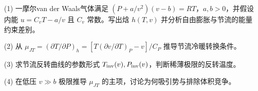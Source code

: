 (1) 一摩尔van der Waals气体满足 \((P+a/v^2)(v-b)=RT\)，\(a,b>0\)，并假设内能 \(u=C_vT-a/v\) 且 \(C_v\) 常数。写出焓 \(h(T,v)\) 并分析自由膨胀与节流的能量约束差别。

(2) 从 \(\mu_{JT}=(\partial T/\partial P)_h=[T(\partial v/\partial T)_P-v]/C_P\) 推导节流冷暖转换条件。

(3) 求节流反转曲线的参数形式 \(T_{\rm inv}(v),P_{\rm inv}(v)\)，判断稀薄极限的反转温度。

(4) 在低压 \(v\gg b\) 极限推导 \(\mu_{JT}\) 的主项，讨论为何吸引势与排除体积竞争。
